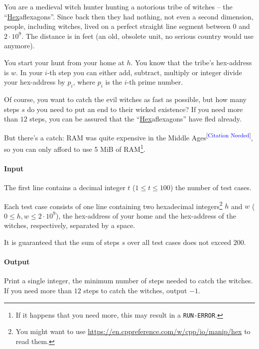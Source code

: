 
\usepackage{hyperref}



\makeheader

You are a medieval witch hunter hunting a notorious tribe of witches -- the “\underline{Hex}aflexagons”.
Since back then they had nothing, not even a second dimension, people, including witches, lived
on a perfect straight line segment between $0$ and $2 \cdot 10^9$. The distance is in feet (an old, obsolete unit,
no serious country would use anymore).

You start your hunt from your home at $h$. You know that the tribe's hex-address is $w$.
In your $i$-th step you can either add, subtract, multiply or integer divide your hex-address by $p_i$,
where $p_i$ is the $i$-th prime number.

Of course, you want to catch the evil witches as fast as possible, but
how many steps $s$ do you need to put an end to their wicked existence?
If you need more than $12$ steps, you can be assured that
the “\underline{Hex}aflexagons” have fled already.

But there's a catch:
RAM was quite expensive in the Middle Ages\textsuperscript{[\textcolor{blue}{Citation Needed}]},
so you can only afford to use 5 MiB of RAM\footnote{If it happens that you need more, this may result in a \texttt{RUN-ERROR}.}.

\paragraph*{Input}

The first line contains a decimal integer $t$ ($1\leq t\leq 100$) the number of test cases.

Each test case consists of one line containing two hexadecimal integers\footnote{You might want to use \url{https://en.cppreference.com/w/cpp/io/manip/hex} to read them.}
$h$ and $w$ ($0 \leq h, w \leq 2\cdot 10^9$), the hex-address of your home and the hex-address of the witches, respectively, separated by a space.

It is guaranteed that the sum of steps $s$ over all test cases does not exceed $200$.

\paragraph*{Output}

Print a single integer, the minimum number of steps needed to catch the witches.
If you need more than $12$ steps to catch the witches, output $-1$.

\begin{samples}
\end{samples}

